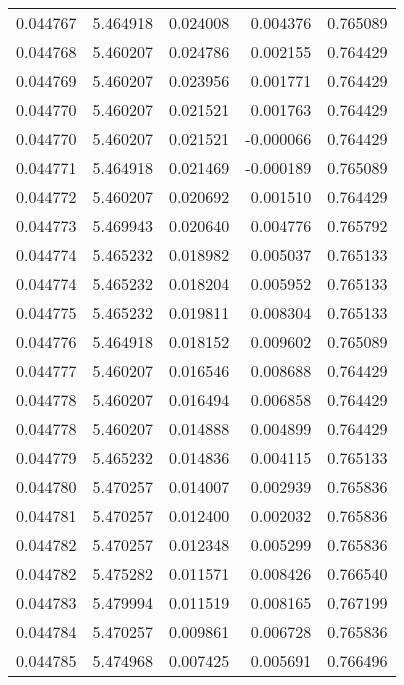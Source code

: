 \begin{tabular}{lrrrr}
0.044767    &  5.464918 &  0.024008 &  0.004376 &             0.765089 \\
0.044768    &  5.460207 &  0.024786 &  0.002155 &             0.764429 \\
0.044769    &  5.460207 &  0.023956 &  0.001771 &             0.764429 \\
0.044770    &  5.460207 &  0.021521 &  0.001763 &             0.764429 \\
0.044770    &  5.460207 &  0.021521 & -0.000066 &             0.764429 \\
0.044771    &  5.464918 &  0.021469 & -0.000189 &             0.765089 \\
0.044772    &  5.460207 &  0.020692 &  0.001510 &             0.764429 \\
0.044773    &  5.469943 &  0.020640 &  0.004776 &             0.765792 \\
0.044774    &  5.465232 &  0.018982 &  0.005037 &             0.765133 \\
0.044774    &  5.465232 &  0.018204 &  0.005952 &             0.765133 \\
0.044775    &  5.465232 &  0.019811 &  0.008304 &             0.765133 \\
0.044776    &  5.464918 &  0.018152 &  0.009602 &             0.765089 \\
0.044777    &  5.460207 &  0.016546 &  0.008688 &             0.764429 \\
0.044778    &  5.460207 &  0.016494 &  0.006858 &             0.764429 \\
0.044778    &  5.460207 &  0.014888 &  0.004899 &             0.764429 \\
0.044779    &  5.465232 &  0.014836 &  0.004115 &             0.765133 \\
0.044780    &  5.470257 &  0.014007 &  0.002939 &             0.765836 \\
0.044781    &  5.470257 &  0.012400 &  0.002032 &             0.765836 \\
0.044782    &  5.470257 &  0.012348 &  0.005299 &             0.765836 \\
0.044782    &  5.475282 &  0.011571 &  0.008426 &             0.766540 \\
0.044783    &  5.479994 &  0.011519 &  0.008165 &             0.767199 \\
0.044784    &  5.470257 &  0.009861 &  0.006728 &             0.765836 \\
0.044785    &  5.474968 &  0.007425 &  0.005691 &             0.766496 \\

\end{tabular}
